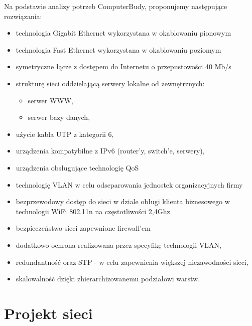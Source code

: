 \documentclass{report}
\begin{document}
Na podstawie analizy potrzeb ComputerBudy, proponujemy
następujące rozwiązania:

\begin{itemize}

\item{technologia Gigabit Ethernet wykorzystana w okablowaniu pionowym}

\item{technologia Fast Ethernet wykorzystana w okablowaniu poziomym}

\item{symetryczne łącze z dostępem do Internetu o przepustowości 40 Mb/s}

\item{strukturę sieci oddzielającą serwery lokalne od zewnętrznych:
 \begin{itemize}
\item serwer WWW,
\item serwer bazy danych,
\end{itemize}}

\item {użycie kabla UTP z kategorii 6,}

\item {urządzenia kompatybilne z IPv6 (router’y, switch’e, serwery),}

\item {urządzenia obsługujące technologię QoS}

\item{technologię VLAN w celu odseparowania jednostek organizacyjnych firmy}

\item{bezprzewodowy dostęp do sieci w dziale obługi klienta biznesowego w technologii WiFi
802.11n na częstotliwości 2,4Ghz}

\item{bezpieczeństwo sieci zapewnione firewall’em}

\item{dodatkowo ochrona realizowana przez specyfikę technologii VLAN,}

\item{redundantność oraz STP - w celu zapewnienia większej niezawodności sieci,}

\item{skalowalność dzięki zhierarchizowanemu podziałowi warstw.}

\end{itemize}


\chapter{Projekt sieci}
\end{document}
